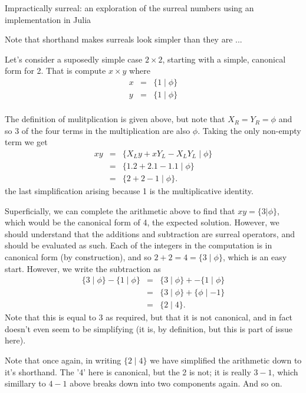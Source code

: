 Impractically surreal: an exploration of the surreal numbers using an implementation in Julia


Note that shorthand makes surreals look simpler than they are ...


Let's consider a suposedly simple case $2 \times 2$, starting with a
simple, canonical form for 2. That is compute $x \times y$ where
\begin{eqnarray*}
  x & = & \{ 1 \mid \phi \} \\
  y & = & \{ 1 \mid \phi \} \\
\end{eqnarray*}

The definition of mulitplication is given above, but note that $X_R =
Y_R = \phi$ and so 3 of the four terms in the multiplication are also
$\phi$. Taking the only non-empty term we get
\begin{eqnarray*}
  x y & = & \{ X_L y + x Y_L - X_L Y_L \mid \phi \} \\
      & = & \{ 1.2 + 2.1 - 1.1 \mid \phi \} \\
      & = & \{ 2 + 2 - 1 \mid \phi \}.
\end{eqnarray*}
the last simplification arising because 1 is the multiplicative identity. 

Superficially, we can complete the arithmetic above to find that $x y
= \{ 3 | \phi \}$, which would be the canonical form of 4, the
expected solution. However, we should understand that the additions
and subtraction are surreal operators, and should be evaluated as
such. Each of the integers in the computation is in canonical form (by
construction), and so $2 + 2 = 4 = \{ 3 \mid \phi \}$, which is an
easy start. However, we write the subtraction as
\begin{eqnarray*}
  \{ 3 \mid \phi \} - \{ 1 \mid \phi \}
  & = &   \{ 3 \mid \phi \} +  -\{ 1 \mid \phi \} \\
  & = &   \{ 3 \mid \phi \} +  \{ \phi \mid -1 \} \\
  & = &   \{ 2 \mid 4 \}.
\end{eqnarray*}
Note that this is equal to 3 as required, but that it is not
canonical, and in fact doesn't even seem to be simplifying (it is, by
definition, but this is part of issue here).

Note that once again, in writing $\{ 2 \mid 4\}$ we have simplified
the arithmetic down to it's shorthand. The '4' here is canonical, but
the 2 is not; it is really $3 - 1$, which simillary to $4-1$ above
breaks down into two components again. And so on.

